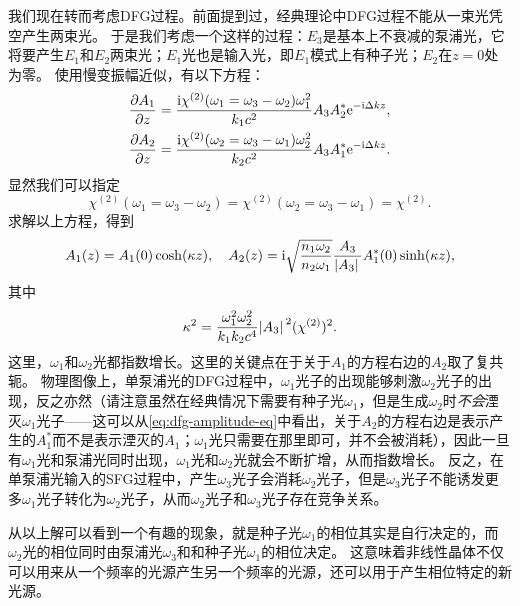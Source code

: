 我们现在转而考虑DFG过程。前面提到过，经典理论中DFG过程不能从一束光凭空产生两束光。
于是我们考虑一个这样的过程：$E_3$是基本上不衰减的泵浦光，它将要产生$E_1$和$E_2$两束光；$E_1$光也是输入光，即$E_1$模式上有种子光；$E_2$在$z=0$处为零。
使用慢变振幅近似，有以下方程：
\begin{equation}
    \begin{aligned}
        \pdv{A_1}{z} &= \frac{\mathrm{i} \chi^{(2)}(\omega_1 = \omega_3 - \omega_2) \omega_1^2}{k_1 c^2} A_3 A_2^* \mathrm{e}^{-\mathrm{i} \Delta k z}, \\
        \pdv{A_2}{z} &= \frac{\mathrm{i} \chi^{(2)}(\omega_2 = \omega_3 - \omega_1) \omega_2^2}{k_2 c^2} A_3 A_1^* \mathrm{e}^{-\mathrm{i} \Delta k z}.
    \end{aligned}
    \label{eq:dfg-amplitude-eq}
\end{equation}
显然我们可以指定
\begin{equation}
    \chi^{(2)}(\omega_1 = \omega_3 - \omega_2) = \chi^{(2)}(\omega_2 = \omega_3 - \omega_1) = \chi^{(2)}.
\end{equation}
求解以上方程，得到
\begin{equation}
    A_1(z) = A_1(0) \cosh(\kappa z), \quad A_2(z) = \mathrm{i} \sqrt{\frac{n_1 \omega_2}{n_2 \omega_1}} \frac{A_3}{\abs*{A_3}} A_1^*(0) \sinh(\kappa z),
    \label{eq:dfg-amplitude}
\end{equation}
其中
\begin{equation}
    \kappa^2 = \frac{\omega_1^2 \omega_2^2}{k_1 k_2 c^4} \abs*{A_3}^2 (\chi^{(2)})^2 .
\end{equation}
这里，$\omega_1$和$\omega_2$光都指数增长。这里的关键点在于关于$A_1$的方程右边的$A_2$取了复共轭。
物理图像上，单泵浦光的DFG过程中，$\omega_1$光子的出现能够刺激$\omega_2$光子的出现，反之亦然（请注意虽然在经典情况下需要有种子光$\omega_1$，但是生成$\omega_2$时\emph{不会}湮灭$\omega_1$光子——这可以从\eqref{eq:dfg-amplitude-eq}中看出，关于$A_2$的方程右边是表示产生的$A_1^*$而不是表示湮灭的$A_1$；$\omega_1$光只需要在那里即可，并不会被消耗），因此一旦有$\omega_1$光和泵浦光同时出现，$\omega_1$光和$\omega_2$光就会不断扩增，从而指数增长。
反之，在单泵浦光输入的SFG过程中，产生$\omega_3$光子会消耗$\omega_2$光子，但是$\omega_3$光子不能诱发更多$\omega_1$光子转化为$\omega_2$光子，从而$\omega_2$光子和$\omega_3$光子存在竞争关系。

从以上解可以看到一个有趣的现象，就是种子光$\omega_1$的相位其实是自行决定的，而$\omega_2$光的相位同时由泵浦光$\omega_3$和和种子光$\omega_1$的相位决定。
这意味着非线性晶体不仅可以用来从一个频率的光源产生另一个频率的光源，还可以用于产生相位特定的新光源。

